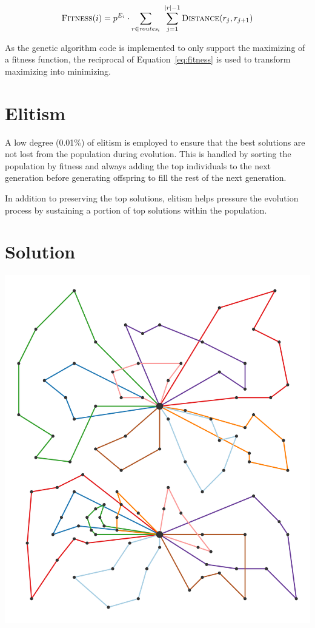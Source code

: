 \documentclass[paper=a4, fontsize=9pt]{scrartcl}
\begin{document}
\begin{multicols}{2}
\begin{equation}
\textsc{Fitness}(i) = p^{E_i} \cdot \sum_{r \in \textit{routes}_i}~\sum_{j=1}^{\vert{} r \vert{} - 1} \textsc{Distance}(r_j, r_{j+1})
\label{eq:fitness}
\end{equation}

As the genetic algorithm code is implemented to only support the maximizing of a fitness function, the reciprocal of Equation~\ref{eq:fitness} is used to transform maximizing into minimizing.

\section*{Elitism}

A low degree (0.01\%) of elitism is employed to ensure that the best solutions are not lost from the population during evolution. This is handled by sorting the population by fitness and always adding the top individuals to the next generation before generating offspring to fill the rest of the next generation.

In addition to preserving the top solutions, elitism helps pressure the evolution process by sustaining a portion of top solutions within the population.

\section*{Solution}

{
\vspace{0.3cm}
\centering
\includegraphics[scale=0.1]{figures/solution.pdf}
\label{figure:flatland_baseline}
\vspace{0.3cm}
}


\end{multicols}
\end{document}
